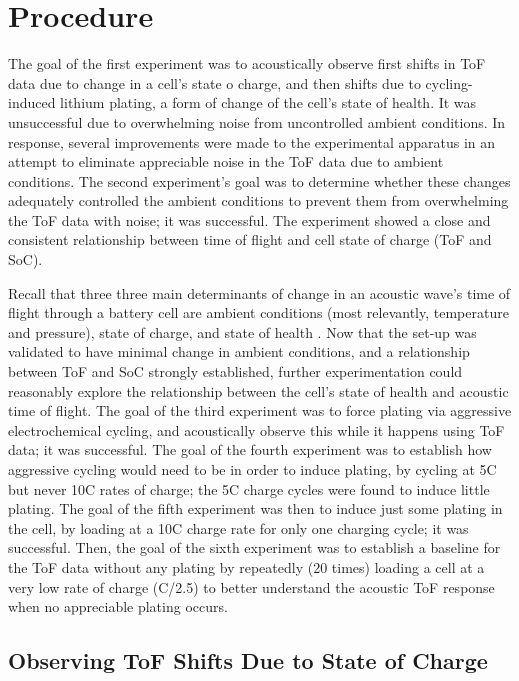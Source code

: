 \chapter{Procedure}
The goal of the first experiment was to acoustically observe first shifts in ToF data due to change in a cell's state o charge, and then shifts due to cycling-induced lithium plating, a form of change of the cell's state of health. It was unsuccessful due to overwhelming noise from uncontrolled ambient conditions. 
In response, several improvements were made to the experimental apparatus in an attempt to eliminate appreciable noise in the ToF data due to ambient conditions. 
The second experiment's goal was to determine whether these changes adequately controlled the ambient conditions to prevent them from overwhelming the ToF data with noise; it was successful. 
The experiment showed a close and consistent relationship between time of flight and cell state of charge (ToF and SoC).

Recall that three three main determinants of change in an acoustic wave's time of flight through a battery cell are ambient conditions (most relevantly, temperature and pressure), state of charge, and state of health . Now that the set-up was validated to have minimal change in ambient conditions, and a relationship between ToF and SoC strongly established, further experimentation could reasonably explore the relationship between the cell's state of health and acoustic time of flight. The goal of the third experiment was to force plating via aggressive electrochemical cycling, and acoustically observe this while it happens using ToF data; it was successful. The goal of the fourth experiment was to establish how aggressive cycling would need to be in order to induce plating, by cycling at 5C but never 10C rates of charge; the 5C charge cycles were found to induce little plating. The goal of the fifth experiment was then to induce just some plating in the cell, by loading at a 10C charge rate for only one charging cycle; it was successful. Then, the goal of the sixth experiment was to establish a baseline for the ToF data without any plating by repeatedly (20 times) loading a cell at a very low rate of charge (C/2.5) to better understand the acoustic ToF response when no appreciable plating occurs.

\section{Observing ToF Shifts Due to State of Charge}

